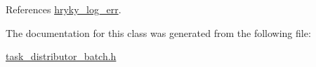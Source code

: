 References \hyperlink{log__writer__common_8h_ae5ad3dabb33f594695ef40753cb78aad}{hryky\-\_\-log\-\_\-err}.



The documentation for this class was generated from the following file\-:\begin{DoxyCompactItemize}
\item 
\hyperlink{task__distributor__batch_8h}{task\-\_\-distributor\-\_\-batch.\-h}\end{DoxyCompactItemize}
